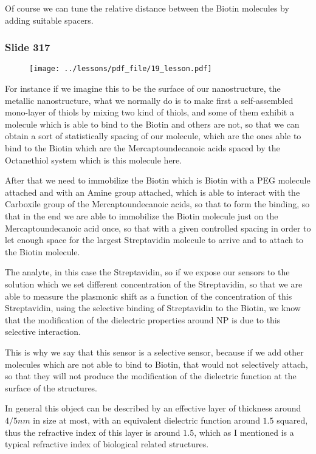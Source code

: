 \documentclass[../main/main.tex]{subfiles}
\begin{document}
Of course we can tune the relative distance between the Biotin molecules by adding suitable spacers.

\newpage

\subsubsection{Slide 317}

\begin{figure}[h!]
\centering
\texttt{[image: ../lessons/pdf\_file/19\_lesson.pdf]}
\end{figure}

For instance if we imagine this to be the surface of our nanostructure, the metallic nanostructure, what we normally do is to make first a self-assembled mono-layer of thiols by mixing two kind of thiols, and some of them exhibit a molecule which is able to bind to the Biotin and others are not, so that we can obtain a sort of statistically spacing of our molecule, which are the ones able to bind to the Biotin which are the Mercaptoundecanoic acids spaced by the Octanethiol system which is this molecule here.

After that we need to immobilize the Biotin which is Biotin with a PEG molecule attached and with an Amine group attached, which is able to interact with the Carboxile group of the Mercaptoundecanoic acids, so that to form the binding, so that in the end we are able to immobilize the Biotin molecule just on the Mercaptoundecanoic acid once, so that with a given controlled spacing in order to let enough space for the largest Streptavidin molecule to arrive and to attach to the Biotin molecule.

The analyte, in this case the Streptavidin, so if we expose our sensors to the solution which we set different concentration of the Streptavidin, so that we are able to measure the plasmonic shift as a function of the concentration of this Streptavidin, using the selective binding of Streptavidin to the Biotin, we know that the modification of the dielectric properties around NP is due to this selective interaction.

This is why we say that this sensor is a selective sensor, because if we add other molecules which are not able to bind to Biotin, that would not selectively attach, so that they will not produce the modification of the dielectric function at the surface of the structures. 

In general this object can be described by an effective layer of thickness around $4/5 nm$ in size at most, with an equivalent dielectric function around $1.5$ squared, thus the refractive index of this layer is around $1.5$, which as I mentioned is a typical refractive index of biological related structures.
\end{document}
